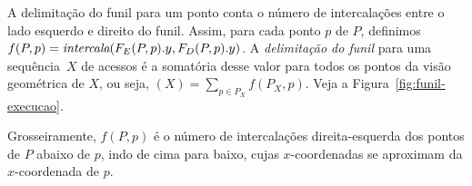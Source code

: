 A delimitação do funil para um ponto conta o número de intercalações entre o lado esquerdo e direito do funil. Assim, para cada ponto $p$ de $P$, definimos $f(P,p) = \emph{intercala}(F_E(P,p).y, F_D(P,p).y)$. A \textit{delimitação do funil} para uma sequência~$X$ de acessos é a somatória desse valor para todos os pontos da visão geométrica de $X$, ou seja, \Funil$(X) = \sum_{p \in P_X}{f(P_X,p)}$. Veja a Figura~\ref{fig:funil-execucao}.

Grosseiramente, $f(P,p)$ é o número de intercalações direita-esquerda dos pontos de $P$ abaixo de $p$, indo de cima para baixo, cujas $x$-coordenadas se aproximam da $x$-coordenada de $p$.

\begin{comment}
    \begin{figure}
        \centering
        \begin{tikzpicture}[scale=0.62]
            \draw[very thin, gray!70] (0,0) grid (8,9);
            
            \draw[fill=gray!90, gray!90] (0,0) rectangle (3,2);
            \draw[fill=gray!90, gray!90] (1,0) rectangle (5,1);

            \draw[red!90, line width=2pt] (7,3) -- (3,2);  

            \filldraw[red] (5,1) circle (6pt);
            \filldraw[red] (3,2) circle (6pt);
            \filldraw[blue] (7,3) circle (6pt);
            \filldraw[black] (1,4) circle (6pt);
            \filldraw[black] (6,5) circle (6pt);
            \filldraw[black] (3,6) circle (6pt);
            \filldraw[black] (4,7) circle (6pt);
            \filldraw[black] (2,8) circle (6pt);





            \draw[black, line width=0.5pt] (0,0) rectangle (8,9);
        \end{tikzpicture}
        \begin{tikzpicture}[scale=0.62]
            \draw[very thin, gray!70] (0,0) grid (8,9);
            
            \draw[fill=gray!90, gray!90] (8,0) rectangle (3,2);
            \draw[fill=gray!90, gray!90] (8,0) rectangle (7,3);


\end{comment}
